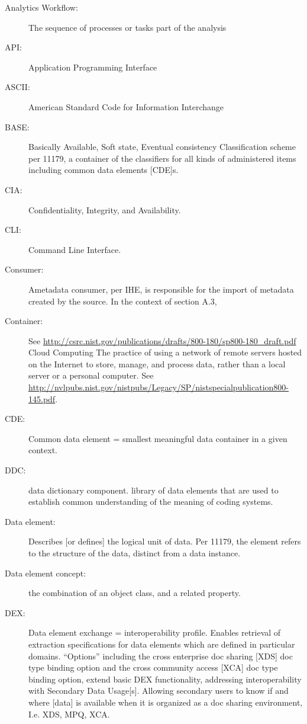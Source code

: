 \begin{description}
\item[Analytics Workflow:] The sequence of processes or tasks part of
  the analysis

\item[API:] Application Programming Interface

\item[ASCII:] American Standard Code for Information Interchange

\item[BASE:] Basically Available, Soft state, Eventual consistency
  Classification scheme per 11179, a container of the classifiers for
  all kinds of administered items including common data elements
  [CDE]s.

\item[CIA:] Confidentiality, Integrity, and Availability.

\item[CLI:] Command Line Interface.

\item[Consumer:] Ametadata consumer, per IHE, is responsible for the
  import of metadata created by the source. In the context of section
  A.3,

\item[Container:] See
  \url{http://csrc.nist.gov/publications/drafts/800-180/sp800-180_draft.pdf}
  Cloud Computing The practice of using a network of remote servers
  hosted on the Internet to store, manage, and process data, rather
  than a local server or a personal computer. See
  \url{http://nvlpubs.nist.gov/nistpubs/Legacy/SP/nistspecialpublication800-145.pdf}.

\item[CDE:] Common data element = smallest meaningful data container
  in a given context.

\item[DDC:] data dictionary component. library of data elements that
  are used to establish common understanding of the meaning of coding
  systems.

\item[Data element:] Describes [or defines] the logical unit of
  data. Per 11179, the element refers to the structure of the data,
  distinct from a data instance.

\item[Data element concept:] the combination of an object class, and a
  related property.

\item[DEX:] Data element exchange = interoperability profile. Enables
  retrieval of extraction specifications for data elements which are
  defined in particular domains. “Options” including the cross
  enterprise doc sharing [XDS] doc type binding option and the cross
  community access [XCA] doc type binding option, extend basic DEX
  functionality, addressing interoperability with Secondary Data
  Usage[s]. Allowing secondary users to know if and where [data] is
  available when it is organized as a doc sharing environment,
  I.e. XDS, MPQ, XCA.


\end{description}

